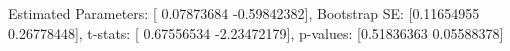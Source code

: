 Estimated Parameters: [ 0.07873684 -0.59842382], Bootstrap SE: [0.11654955 0.26778448], t-stats: [ 0.67556534 -2.23472179], p-values: [0.51836363 0.05588378]
